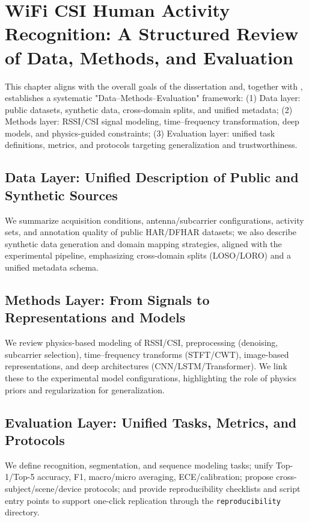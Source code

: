 \chapter{WiFi CSI Human Activity Recognition: A Structured Review of Data, Methods, and Evaluation}
\label{chap:review}

This chapter aligns with the overall goals of the dissertation and, together with , establishes a systematic "Data–Methods–Evaluation" framework:
(1) Data layer: public datasets, synthetic data, cross-domain splits, and unified metadata;
(2) Methods layer: RSSI/CSI signal modeling, time–frequency transformation, deep models, and physics-guided constraints;
(3) Evaluation layer: unified task definitions, metrics, and protocols targeting generalization and trustworthiness.

\section{Data Layer: Unified Description of Public and Synthetic Sources}
We summarize acquisition conditions, antenna/subcarrier configurations, activity sets, and annotation quality of public HAR/DFHAR datasets; we also describe synthetic data generation and domain mapping strategies, aligned with the experimental pipeline, emphasizing cross-domain splits (LOSO/LORO) and a unified metadata schema.

\section{Methods Layer: From Signals to Representations and Models}
We review physics-based modeling of RSSI/CSI, preprocessing (denoising, subcarrier selection), time–frequency transforms (STFT/CWT), image-based representations, and deep architectures (CNN/LSTM/Transformer). We link these to the experimental model configurations, highlighting the role of physics priors and regularization for generalization.

\section{Evaluation Layer: Unified Tasks, Metrics, and Protocols}
We define recognition, segmentation, and sequence modeling tasks; unify Top-1/Top-5 accuracy, F1, macro/micro averaging, ECE/calibration; propose cross-subject/scene/device protocols; and provide reproducibility checklists and script entry points to support one-click replication through the \texttt{reproducibility} directory.


